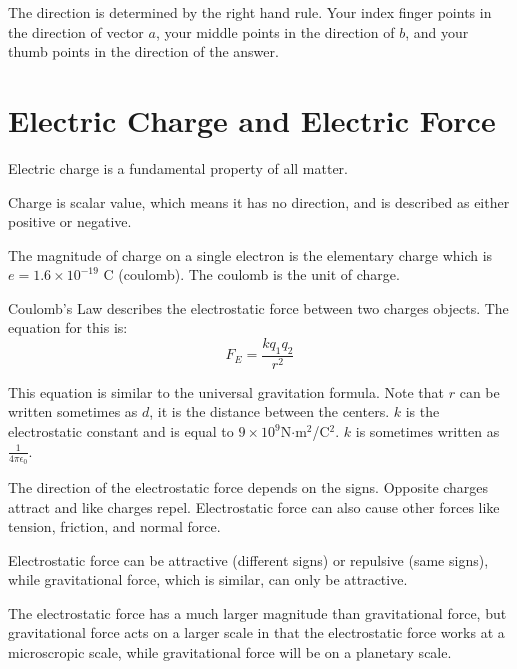 \documentclass[../em.tex]{subfiles}
\begin{document}
The direction is determined by the right hand rule. Your index finger points in the direction of 
vector $a$, your middle points in the direction of $b$, and your thumb points in the direction of the answer.

\section{Electric Charge and Electric Force}
Electric charge is a fundamental property of all matter.

Charge is scalar value, which means it has no direction, and is described as either positive or negative.

The magnitude of charge on a single electron is the elementary charge which is 
$e = 1.6\times 10^{-19}$ C (coulomb). The coulomb is the unit of charge.

Coulomb's Law describes the electrostatic force between two charges objects. The equation for this is:
\[F_E=\frac{kq_1q_2}{r^2}\]

This equation is similar to the universal gravitation formula. Note that 
$r$ can be written sometimes as $d$, it is the distance between the centers. 
$k$ is the electrostatic constant and is equal to $9\times10^9$N$\cdot $m$^2$/C$^2$. $k$ 
is sometimes written as $\frac{1}{4\pi\epsilon_0}$.

The direction of the electrostatic force depends on the signs. 
Opposite charges attract and like charges repel. Electrostatic force can also cause 
other forces like tension, friction, and normal force.

Electrostatic force can be attractive (different signs) or repulsive (same signs), 
while gravitational force, which is similar, can only be attractive. 

The electrostatic force has a much larger magnitude than gravitational force, but 
gravitational force acts on a larger scale in that the electrostatic force works at a 
microscropic scale, while gravitational force will be on a planetary scale.
\end{document}
